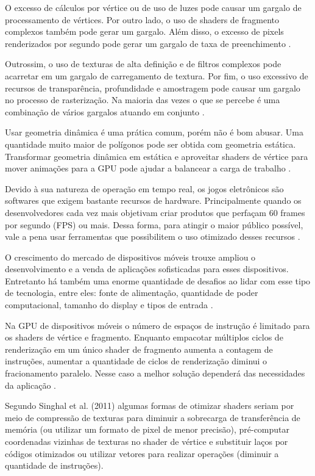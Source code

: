 O excesso de cálculos por vértice ou de uso de luzes pode causar um gargalo de processamento de vértices. Por outro lado, o uso de shaders de fragmento complexos também pode gerar um gargalo. Além disso, o excesso de pixels renderizados por segundo pode gerar um gargalo de taxa de preenchimento \cite{riguer2002performance}.

Outrossim, o uso de texturas de alta definição e de filtros complexos pode acarretar em um gargalo de carregamento de textura. Por fim, o uso excessivo de recursos de transparência, profundidade e amostragem pode causar um gargalo no processo de rasterização. Na maioria das vezes o que se percebe é uma combinação de vários gargalos atuando em conjunto \cite{riguer2002performance}. 

Usar geometria dinâmica é uma prática comum, porém não é bom abusar. Uma quantidade muito maior de polígonos pode ser obtida com geometria estática. Transformar geometria dinâmica em estática e aproveitar shaders de vértice para mover animações para a GPU pode ajudar a balancear a carga de trabalho \cite{riguer2002performance}. 

Devido à sua natureza de operação em tempo real, os jogos eletrônicos são softwares que exigem bastante recursos de hardware. Principalmente quando os desenvolvedores cada vez mais objetivam criar produtos que perfaçam 60 frames por segundo (FPS) ou mais. Dessa forma, para atingir o maior público possível, vale a pena usar ferramentas que possibilitem o uso otimizado desses recursos \cite{comparacaoDesempenho}.

O crescimento do mercado de dispositivos móveis trouxe ampliou o desenvolvimento e a venda de aplicações sofisticadas para esses dispositivos. Entretanto há também uma enorme quantidade de desafios ao lidar com esse tipo de tecnologia, entre eles: fonte de alimentação, quantidade de poder computacional, tamanho do display e tipos de entrada \cite{optimizationMobile}.

Na GPU de dispositivos móveis o número de espaços de instrução é limitado para os shaders de vértice e fragmento. Enquanto empacotar múltiplos ciclos de renderização em um único shader de fragmento aumenta a contagem de instruções, aumentar a quantidade de ciclos de renderização diminui o fracionamento paralelo. Nesse caso a melhor solução dependerá das necessidades da aplicação \cite{designMobileGPU}. 

Segundo Singhal et al. (2011) algumas formas de otimizar shaders seriam por meio de compressão de texturas para diminuir a sobrecarga de transferência de memória (ou utilizar um formato de pixel de menor precisão), pré-computar coordenadas vizinhas de texturas no shader de vértice e substituir laços por códigos otimizados ou utilizar vetores para realizar operações (diminuir a quantidade de instruções).

